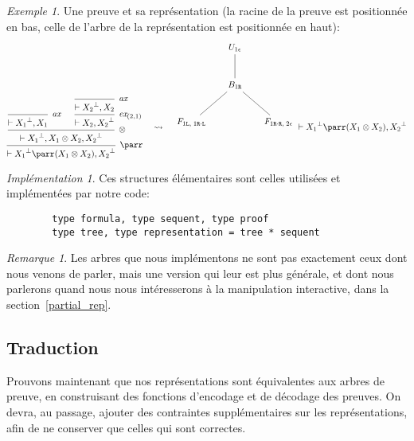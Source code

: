 \documentclass[11pt,a4paper]{article}
\theoremstyle{plain}
\theoremstyle{definition}
\theoremstyle{remark}
\newtheorem{remark}{Remarque}
\newtheorem{example}{Exemple}
\newtheorem{implementation}{Implémentation}
\newcommand*{\orth}{^\perp}
\newcommand*{\tensor}{\otimes}
\newcommand*{\axv}[1]{\infer{0}[\ensuremath{\mathit{ax}}]{\vdash #1}}
\newcommand*{\tensorv}[1]{\infer{2}[\ensuremath{\tensor}]{\vdash #1}}
\newcommand*{\parrv}[1]{\infer{1}[\ensuremath{\parr}]{\vdash #1}}
\newcommand*{\permv}[2]{\infer{1}[\ensuremath{\textit{ex}_{#1}}]{\vdash #2}}
\newcommand*{\Left}{\textnormal{\texttt{L}}}
\newcommand*{\Right}{\textnormal{\texttt{R}}}
\begin{document}
\begin{example}
\label{rep_example}
Une preuve et sa représentation (la racine de la preuve est positionnée en bas, celle de l'arbre de la représentation est positionnée en haut):
\begin{equation*}
\begin{prooftree}
    \axv{{X_1}\orth, X_1}
    \axv{{X_2}\orth, X_2}
    \permv{(2, 1)}{X_2, {X_2}\orth}
    \tensorv{{X_1}\orth, X_1 \tensor X_2, {X_2}\orth}
    \parrv{{X_1}\orth \parr (X_1 \tensor X_2), {X_2}\orth}
\end{prooftree}
\quad\leadsto\quad
\begin{tikzpicture}%
    [level distance=1.5cm,
    level 2/.style={sibling distance=3.5cm}]
    \node {$U_{1 \epsilon}$}
    child {node {$B_{1 \Right}$}
        child {node {$F_{1 \Left, \; 1 \Right \cdot \Left}$}}
        child {node {$F_{1 \Right \cdot \Right, \; 2 \epsilon}$}}
    };
\end{tikzpicture}
\vdash {X_1}\orth \parr (X_1 \tensor X_2), {X_2}\orth
\end{equation*}
\end{example}

\begin{implementation}
    Ces structures élémentaires sont celles utilisées et implémentées par notre code:
    
    \label{implement_trees}
    \begin{verbatim}
        type formula, type sequent, type proof
        type tree, type representation = tree * sequent
    \end{verbatim}

    \begin{remark}
        Les arbres que nous implémentons ne sont pas exactement ceux dont nous venons de parler, mais une version qui leur est plus générale, et dont nous parlerons quand nous nous intéresserons à la manipulation interactive, dans la section~\ref{partial_rep}.
    \end{remark}

\end{implementation}

\subsection{Traduction}
Prouvons maintenant que nos représentations sont équivalentes aux arbres de preuve, en construisant des fonctions d'encodage et de décodage des preuves. On devra, au passage, ajouter des contraintes supplémentaires sur les représentations, afin de ne conserver que celles qui sont correctes.
\end{document}
